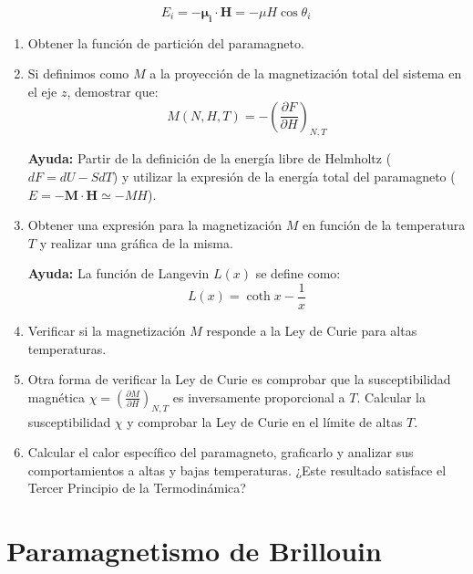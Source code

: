 \documentclass[a4paper,11pt]{article}
\begin{document}
$$ E_i = - \boldsymbol{\mu_i} \cdot \textbf{H} = - \mu H \cos \theta_i $$


\begin{enumerate}[label=(\alph*),
                  leftmargin=2\parindent,
                  rightmargin=2\parindent]

    \item{Obtener la función de partición del paramagneto.}

    \item{Si definimos como $M$ a la proyección de la magnetización total del
          sistema en el eje $z$, demostrar que:
          $$ M(N, H, T) = - \left( \frac{\partial F}{\partial H}
          \right)_{N, T}$$
          }

    {\small
    \textbf{Ayuda:}
    Partir de la definición de la energía libre de Helmholtz ($ dF = dU
    - S dT$) y utilizar la expresión de la energía total del
    paramagneto ($ E = - \textbf{M} \cdot \textbf{H} \simeq - MH$).
    }

    \item{Obtener una expresión para la magnetización $M$ en función
          de la temperatura $T$ y realizar una gráfica de la misma.}

    {\small
    \textbf{Ayuda:} La función de Langevin $L(x)$ se define como:
    $$ L(x) = \coth x - \frac{1}{x} $$
    }

    \item{Verificar si la magnetización $M$ responde a la Ley de Curie
          para altas temperaturas.}

    \item{Otra forma de verificar la Ley de Curie es comprobar que la
          susceptibilidad magnética
          $\chi = \left( \frac{\partial M}{\partial H}\right)_{N, T}$
          es inversamente proporcional a $T$.
          Calcular la susceptibilidad $\chi$ y comprobar la Ley de
          Curie en el límite de altas $T$.
          }

    \item{Calcular el calor específico del paramagneto, graficarlo y
          analizar sus comportamientos a altas y bajas temperaturas.
          ¿Este resultado satisface el Tercer Principio de la
          Termodinámica?}


\end{enumerate}

\section{Paramagnetismo de Brillouin}
\end{document}
